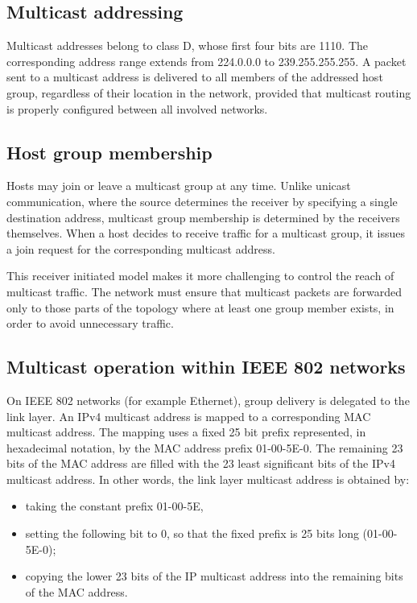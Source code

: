 \subsection{Multicast addressing}

Multicast addresses belong to class D, whose first four bits are 1110. The corresponding address range extends from 224.0.0.0 to 239.255.255.255. A packet sent to a multicast address is delivered to all members of the addressed host group, regardless of their location in the network, provided that multicast routing is properly configured between all involved networks.

\subsection{Host group membership}

Hosts may join or leave a multicast group at any time. Unlike unicast communication, where the source determines the receiver by specifying a single destination address, multicast group membership is determined by the receivers themselves. When a host decides to receive traffic for a multicast group, it issues a join request for the corresponding multicast address.

This receiver initiated model makes it more challenging to control the reach of multicast traffic. The network must ensure that multicast packets are forwarded only to those parts of the topology where at least one group member exists, in order to avoid unnecessary traffic.

\subsection{Multicast operation within IEEE 802 networks}

On IEEE 802 networks (for example Ethernet), group delivery is delegated to the link layer. An IPv4 multicast address is mapped to a corresponding MAC multicast address. The mapping uses a fixed 25 bit prefix represented, in hexadecimal notation, by the MAC address prefix 01-00-5E-0. The remaining 23 bits of the MAC address are filled with the 23 least significant bits of the IPv4 multicast address. In other words, the link layer multicast address is obtained by:

\begin{itemize}
\item taking the constant prefix 01-00-5E,
\item setting the following bit to 0, so that the fixed prefix is 25 bits long (01-00-5E-0);
\item copying the lower 23 bits of the IP multicast address into the remaining bits of the MAC address.
\end{itemize}


